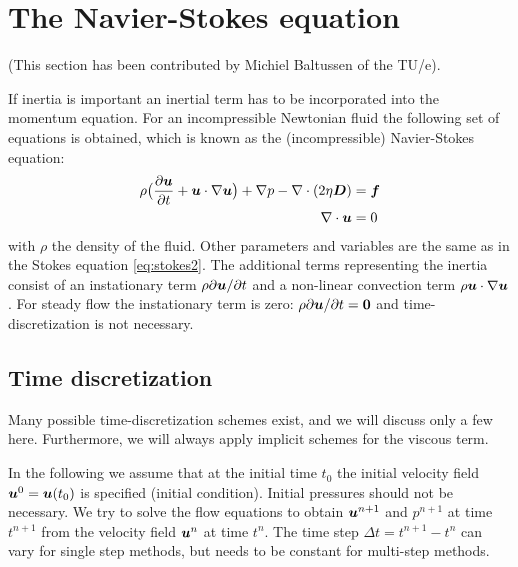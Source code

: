 
\def\headdate{8th April 2018}

\section{The Navier-Stokes equation}
\label{sec:navierstokes}

(This section has been contributed by Michiel Baltussen of the TU/e).

If inertia is important an inertial term has to be incorporated into the momentum equation. 
For an incompressible Newtonian fluid the following set of equations is obtained, which is known as
the (incompressible) Navier-Stokes equation:
\begin{align}
 \rho \big( \frac{\partial \boldsymbol{u}}{\partial t} +
     \boldsymbol{u} \cdot \nabla \boldsymbol{u} \big) + \nabla p 
         - \nabla \cdot ( 2 \eta \boldsymbol{D}) &=\boldsymbol{f} \label{eq:nav_stokes1} \\
\nabla \cdot \boldsymbol{u} &= 0
\label{eq:nav_stokes2}
\end{align} 
with $\rho$ the density of the fluid. Other parameters and variables are the same as in the Stokes equation \ref{eq:stokes2}.
The additional terms representing the inertia consist of an instationary term $\rho\partial \boldsymbol{u}/\partial t$ and a non-linear convection
term $\rho\boldsymbol{u} \cdot \nabla \boldsymbol{u}$. For steady flow the instationary term is zero: $\rho\partial \boldsymbol{u}/\partial t=\boldsymbol{0}$ and
time-discretization is not necessary.

\subsection{Time discretization}

Many possible time-discretization schemes exist, and we will discuss only a few here. Furthermore, we will always apply implicit schemes for the viscous term.

In the following we assume that at the initial time $t_0$ the
initial velocity field $\boldsymbol{u}^0=\boldsymbol{u}(t_0)$ is specified (initial condition). 
Initial pressures should not be necessary.
We try to solve the flow equations to
obtain $\boldsymbol{u}^{n+1}$ and $p^{n+1}$ at time $t^{n+1}$
from the velocity field $\boldsymbol{u}^{n}$
at time $t^{n}$. The time step $\Delta t=t^{n+1}-t^n$ can vary for single step methods, but needs to be constant for multi-step methods.


